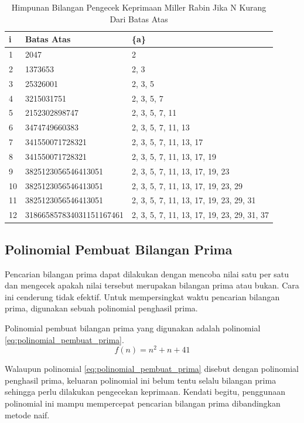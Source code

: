 \begin{table}[h!]
	\caption{Himpunan Bilangan Pengecek Keprimaan Miller Rabin Jika N Kurang Dari Batas Atas}
	\label{tab:miller_rabin_deterministic_a}
	\ttfamily
	\begin{tabularx}{\linewidth}{ |l|l|X| }
		\hline
		i&	Batas Atas&	\{a\} \\
		\hline
		1&	2047&	2 \\
		2&	1373653&	2, 3 \\
		3&	25326001&	2, 3, 5 \\
		4&	3215031751&	2, 3, 5, 7 \\
		5&	2152302898747&	2, 3, 5, 7, 11 \\
		6&	3474749660383&	2, 3, 5, 7, 11, 13 \\
		7&	341550071728321&	2, 3, 5, 7, 11, 13, 17 \\
		8&	341550071728321&	2, 3, 5, 7, 11, 13, 17, 19 \\
		9&	3825123056546413051&	2, 3, 5, 7, 11, 13, 17, 19, 23 \\
		10&	3825123056546413051&	2, 3, 5, 7, 11, 13, 17, 19, 23, 29 \\
		11&	3825123056546413051&	2, 3, 5, 7, 11, 13, 17, 19, 23, 29, 31 \\
		12&	318665857834031151167461&	2, 3, 5, 7, 11, 13, 17, 19, 23, 29, 31, 37 \\
		\hline
	\end{tabularx}
\end{table}

\subsection{ Polinomial Pembuat Bilangan Prima}

Pencarian bilangan prima dapat dilakukan dengan mencoba nilai satu per satu dan mengecek apakah nilai tersebut merupakan bilangan prima atau bukan. Cara ini cenderung tidak efektif. Untuk mempersingkat waktu pencarian bilangan prima, digunakan sebuah polinomial penghasil prima.

Polinomial pembuat bilangan prima yang digunakan adalah polinomial \eqref{eq:polinomial_pembuat_prima}. \cite{wolfram_prime_polynomial}
\begin{equation}
f(n)=n^2+n+41
\label{eq:polinomial_pembuat_prima}
\end{equation}

Walaupun polinomial \eqref{eq:polinomial_pembuat_prima} disebut dengan polinomial penghasil prima, keluaran polinomial ini belum tentu selalu bilangan prima sehingga perlu dilakukan pengecekan keprimaan. Kendati begitu, penggunaan polinomial ini mampu mempercepat pencarian bilangan prima dibandingkan metode naif.
